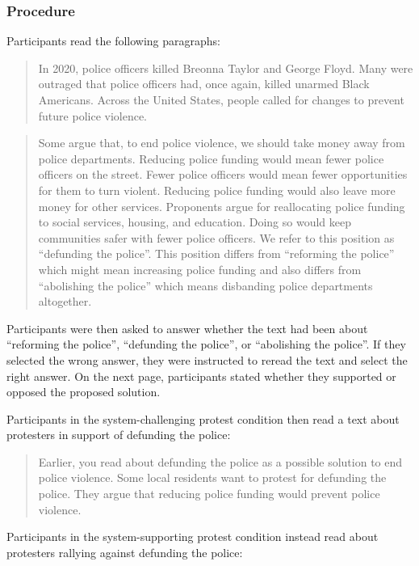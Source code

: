 \documentclass[12pt, letterpaper]{article}
\begin{document}
\hypertarget{procedure-1}{%
\subsubsection{Procedure}\label{procedure-1}}

Participants read the following paragraphs:

\begin{quote}
In 2020, police officers killed Breonna Taylor and George Floyd. Many
were outraged that police officers had, once again, killed unarmed Black
Americans. Across the United States, people called for changes to
prevent future police violence.
\end{quote}

\begin{quote}
Some argue that, to end police violence, we should take money away from
police departments. Reducing police funding would mean fewer police
officers on the street. Fewer police officers would mean fewer
opportunities for them to turn violent. Reducing police funding would
also leave more money for other services. Proponents argue for
reallocating police funding to social services, housing, and education.
Doing so would keep communities safer with fewer police officers. We
refer to this position as ``defunding the police''. This position
differs from ``reforming the police'' which might mean increasing police
funding and also differs from ``abolishing the police'' which means
disbanding police departments altogether.
\end{quote}

\noindent Participants were then asked to answer whether the text had
been about ``reforming the police'', ``defunding the police'', or
``abolishing the police''. If they selected the wrong answer, they were
instructed to reread the text and select the right answer. On the next
page, participants stated whether they supported or opposed the proposed
solution.

Participants in the system-challenging protest condition then read a
text about protesters in support of defunding the police:

\begin{quote}
Earlier, you read about defunding the police as a possible solution to
end police violence. Some local residents want to protest for defunding
the police. They argue that reducing police funding would prevent police
violence.
\end{quote}

\noindent Participants in the system-supporting protest condition
instead read about protesters rallying against defunding the police:
\end{document}
